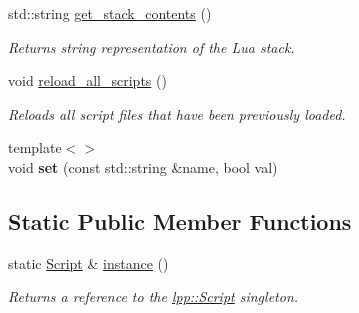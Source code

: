 \begin{DoxyCompactItemize}
std\+::string \hyperlink{classlpp_1_1_script_a232aa76e2307bf1fbd0e3e890edd3874}{get\+\_\+stack\+\_\+contents} ()
\begin{DoxyCompactList}\small\item\em Returns string representation of the Lua stack. \end{DoxyCompactList}\item 
void \hyperlink{classlpp_1_1_script_a2a97d7191cff462376326efb9e3ad841}{reload\+\_\+all\+\_\+scripts} ()
\begin{DoxyCompactList}\small\item\em Reloads all script files that have been previously loaded. \end{DoxyCompactList}\item 
{\footnotesize template$<$$>$ }\\void {\bfseries set} (const std\+::string \&name, bool val)\hypertarget{classlpp_1_1_script_a07d0738e7298bc93b98fcae4241fca85}{}\label{classlpp_1_1_script_a07d0738e7298bc93b98fcae4241fca85}

\end{DoxyCompactItemize}
\subsection*{Static Public Member Functions}
\begin{DoxyCompactItemize}
\item 
static \hyperlink{classlpp_1_1_script}{Script} \& \hyperlink{classlpp_1_1_script_a9ca5b255301a8e9a1aedc15e62fe677c}{instance} ()
\begin{DoxyCompactList}\small\item\em Returns a reference to the \hyperlink{classlpp_1_1_script}{lpp\+::\+Script} singleton. \end{DoxyCompactList}\end{DoxyCompactItemize}
